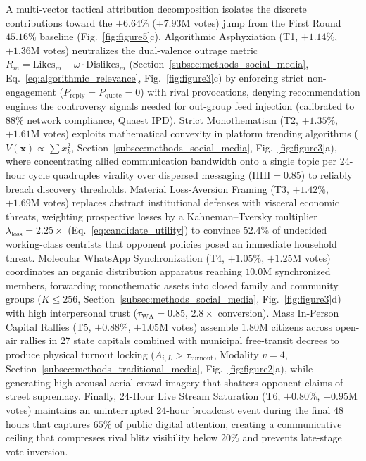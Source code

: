 \documentclass{article}
\begin{document}
A multi-vector tactical attribution decomposition isolates the discrete contributions toward the $+6.64\%$ ($+7.93\mathrm{M}$ votes) jump from the First Round $45.16\%$ baseline (Fig.~\ref{fig:figure5}c). Algorithmic Asphyxiation (T1, $+1.14\%$, $+1.36\mathrm{M}$ votes) neutralizes the dual-valence outrage metric $R_m = \mathrm{Likes}_m + \omega \cdot \mathrm{Dislikes}_m$ (Section~\ref{subsec:methods_social_media}, Eq.~\eqref{eq:algorithmic_relevance}, Fig.~\ref{fig:figure3}c) by enforcing strict non-engagement ($P_{\mathrm{reply}} = P_{\mathrm{quote}} = 0$) with rival provocations, denying recommendation engines the controversy signals needed for out-group feed injection (calibrated to $88\%$ network compliance, Quaest IPD). Strict Monothematism (T2, $+1.35\%$, $+1.61\mathrm{M}$ votes) exploits mathematical convexity in platform trending algorithms ($V(\mathbf{x}) \propto \sum x_k^2$, Section~\ref{subsec:methods_social_media}, Fig.~\ref{fig:figure3}a), where concentrating allied communication bandwidth onto a single topic per 24-hour cycle quadruples virality over dispersed messaging ($\mathrm{HHI} = 0.85$) to reliably breach discovery thresholds. Material Loss-Aversion Framing (T3, $+1.42\%$, $+1.69\mathrm{M}$ votes) replaces abstract institutional defenses with visceral economic threats, weighting prospective losses by a Kahneman--Tversky multiplier $\lambda_{\mathrm{loss}} = 2.25\times$ (Eq.~\eqref{eq:candidate_utility}) \citep{kahneman1979prospect} to convince $52.4\%$ of undecided working-class centrists that opponent policies posed an immediate household threat. Molecular WhatsApp Synchronization (T4, $+1.05\%$, $+1.25\mathrm{M}$ votes) coordinates an organic distribution apparatus reaching $10.0\mathrm{M}$ synchronized members, forwarding monothematic assets into closed family and community groups ($K \le 256$, Section~\ref{subsec:methods_social_media}, Fig.~\ref{fig:figure3}d) with high interpersonal trust ($\tau_{\mathrm{WA}} = 0.85$, $2.8\times$ conversion). Mass In-Person Capital Rallies (T5, $+0.88\%$, $+1.05\mathrm{M}$ votes) assemble $1.80\mathrm{M}$ citizens across open-air rallies in 27 state capitals combined with municipal free-transit decrees to produce physical turnout locking ($A_{i,L} > \tau_{\mathrm{turnout}}$, Modality $v=4$, Section~\ref{subsec:methods_traditional_media}, Fig.~\ref{fig:figure2}a), while generating high-arousal aerial crowd imagery that shatters opponent claims of street supremacy. Finally, 24-Hour Live Stream Saturation (T6, $+0.80\%$, $+0.95\mathrm{M}$ votes) maintains an uninterrupted 24-hour broadcast event during the final 48 hours that captures $65\%$ of public digital attention, creating a communicative ceiling that compresses rival blitz visibility below $20\%$ and prevents late-stage vote inversion.
\end{document}
